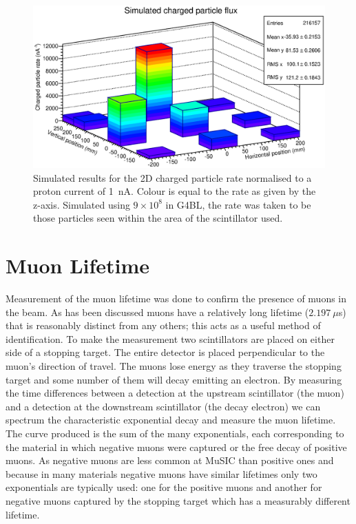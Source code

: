 \begin{figure}[hptb]
  \centering  
    \includegraphics[width=.9\textwidth]{images/plot_generating_scripts/sim_2d_charged_flux.eps}
  \caption{Simulated results for the 2D charged particle rate normalised to a proton current of 1~nA. Colour is equal to the rate as given by the z-axis. Simulated using \( 9\times10^8 \) in G4BL, the rate was taken to be those particles seen within the area of the scintillator used.}
  \label{fig:sim_2d_charged_flux}
\end{figure}

\clearpage

\section{Muon Lifetime} %
\label{cha:muon_lifetime}
Measurement of the muon lifetime was done to confirm the presence of muons in the beam. As has been discussed muons have a relatively long lifetime (\(2.197~\mu\)s) that is reasonably distinct from any others; this acts as a useful method of identification. To make the measurement two scintillators are placed on either side of a stopping target. The entire detector is placed perpendicular to the muon's direction of travel. The muons lose energy as they traverse the stopping target and some number of them will decay emitting an electron. By measuring the time differences between a detection at the upstream scintillator (the muon) and a detection at the downstream scintillator (the decay electron) we can spectrum the characteristic exponential decay and measure the muon lifetime. The curve produced is the sum of the many exponentials, each corresponding to the material in which negative muons were captured or the free decay of positive muons. As negative muons are less common at MuSIC than positive ones and because in many materials negative muons have similar lifetimes only two exponentials are typically used: one for the positive muons and another for negative muons captured by the stopping target which has a measurably different lifetime.

